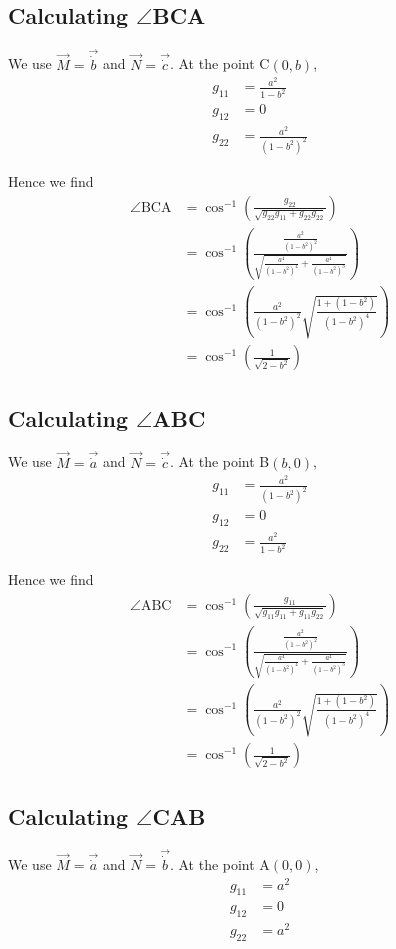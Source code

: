 \documentclass[a4paper]{article} %
\begin{document}
\subsection*{Calculating $\angle$BCA}
We use $\vec{M}=\vec{\dot{b}}$ and $\vec{N}=\vec{\dot{c}}$. At the point C$(0,b)$,
\begin{align}
g_{11}&=\frac{a^2}{1-b^2}\\
g_{12}&=0\\
g_{22}&=\frac{a^2}{(1-b^2)^2}
\end{align}

Hence we find
\begin{align}
\angle\text{BCA}&=\cos^{-1}\left(\frac{g_{22}}{\sqrt{g_{22}g_{11}+g_{22}g_{22}}}\right)\\
&=\cos^{-1}\left(\frac{\frac{a^2}{(1-b^2)^{2}}}{\sqrt{\frac{a^4}{(1-b^2)^4}+\frac{a^4}{(1-b^2)^3}}}
\right)\\
&=\cos^{-1}\left(\frac{a^2}{(1-b^2)^2}\sqrt{\frac{1+(1-b^2)}{(1-b^2)^4}}\right)\\
&=\cos^{-1}\left(\frac{1}{\sqrt{2-b^2}}\right)
\end{align}

\subsection*{Calculating $\angle$ABC}
We use $\vec{M}=\vec{\dot{a}}$ and $\vec{N}=\vec{\dot{c}}$. At the point B$(b,0)$,
\begin{align}
g_{11}&=\frac{a^2}{(1-b^2)^2}\\
g_{12}&=0\\
g_{22}&=\frac{a^2}{1-b^2}
\end{align}

Hence we find
\begin{align}
\angle\text{ABC}&=\cos^{-1}\left(\frac{g_{11}}{\sqrt{g_{11}g_{11}+g_{11}g_{22}}}\right)\\
&=\cos^{-1}\left(\frac{\frac{a^2}{(1-b^2)^{2}}}{\sqrt{\frac{a^4}{(1-b^2)^4}+\frac{a^4}{(1-b^2)^3}}}
\right)\\
&=\cos^{-1}\left(\frac{a^2}{(1-b^2)^2}\sqrt{\frac{1+(1-b^2)}{(1-b^2)^4}}\right)\\
&=\cos^{-1}\left(\frac{1}{\sqrt{2-b^2}}\right)
\end{align}


\subsection*{Calculating $\angle$CAB}
We use $\vec{M}=\vec{\dot{a}}$ and $\vec{N}=\vec{\dot{b}}$. At the point A$(0,0)$,
\begin{align}
g_{11}&=a^2\\
g_{12}&=0\\
g_{22}&=a^2
\end{align}
\end{document}

